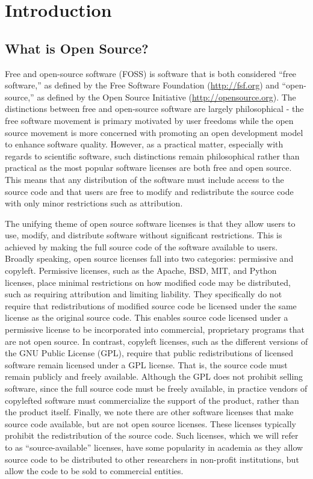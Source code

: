 \section{Introduction}

\subsection*{What is Open Source?}

Free and open-source software (FOSS) is software that is both considered ``free software,'' as defined by the Free Software Foundation (\url{http://fsf.org}) and ``open-source,'' as defined by the Open Source Initiative (\url{http://opensource.org}).  The distinctions between free and open-source software are largely philosophical  - the free software movement is primary motivated by user freedoms while the open source movement is more concerned with promoting an open development model to enhance software quality.  However, as a practical matter, especially with regards to scientific software, such distinctions remain philosophical rather than practical as the most popular software licenses are both free and open source.  This means that any distribution of the software must include access to the source code and that users are free to modify and redistribute the source code with only minor restrictions such as attribution.

The unifying theme of open source software licenses is that they allow users to use, modify, and distribute software without significant restrictions.  This is achieved by making the full source code of the software available to users.  Broadly speaking, open source licenses fall into two categories: permissive and copyleft. Permissive licenses, such as the Apache, BSD, MIT, and Python licenses, place minimal restrictions on how modified code may be distributed, such as requiring attribution and limiting liability.  They specifically do not require that redistributions of modified source code be licensed under the same license as the original source code.  This enables source code licensed under a permissive license to be incorporated into commercial, proprietary programs that are not open source.  In contrast, copyleft licenses, such as the different versions of the GNU Public License (GPL), require that public redistributions of licensed software remain licensed under a GPL license.  That is, the source code must remain publicly and freely available. Although the GPL does not prohibit selling software, since the full source code must be freely available, in practice vendors of copylefted software must commercialize the support of the product, rather than the product itself. Finally, we note there are other software licenses that make source code available, but are not open source licenses.  These licenses typically prohibit the redistribution of the source code.  Such licenses, which we will refer to as ``source-available'' licenses, have some popularity in academia as they allow source code to be distributed to other researchers in non-profit institutions, but allow the code to be sold to commercial entities. 

